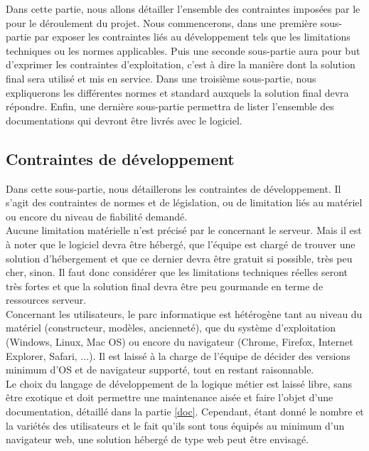 Dans cette partie, nous allons détailler l'ensemble des contraintes imposées par le \client{} pour le déroulement du projet. Nous commencerons, dans une première sous-partie par exposer les contraintes liés au développement tels que les limitations techniques ou les normes applicables. Puis une seconde sous-partie aura pour but d'exprimer les contraintes d'exploitation, c'est à dire la manière dont la solution final sera utilisé et mis en service. Dans une troisième sous-partie, nous expliquerons les différentes normes et standard auxquels la solution final devra répondre. Enfin, une dernière sous-partie permettra de lister l'ensemble des documentations qui devront être livrés avec le logiciel.


\subsection{Contraintes de développement}
Dans cette sous-partie, nous détaillerons les contraintes de développement. Il s'agit des contraintes de normes et de législation, ou de limitation liés au matériel ou encore du niveau de fiabilité demandé.\\


Aucune limitation matérielle n'est précisé par le \client{} concernant le serveur. Mais il est à noter que le logiciel devra être hébergé, que l'équipe \PICCourt{} est chargé de trouver une solution d'hébergement et que ce dernier devra être gratuit si possible, très peu cher, sinon. Il faut donc considérer que les limitations techniques réelles seront très fortes et que la solution final devra être peu gourmande en terme de ressources serveur.\\

Concernant les utilisateurs, le parc informatique est hétérogène tant au niveau du matériel (constructeur, modèles, ancienneté), que du système d'exploitation (Windows, Linux, Mac OS) ou encore du navigateur (Chrome, Firefox, Internet Explorer, Safari, ...). Il est laissé à la charge de l'équipe \PICCourt{} de décider des versions minimum d'OS et de navigateur supporté, tout en restant raisonnable.\\

Le choix du langage de développement de la logique métier est laissé libre, sans être exotique et doit permettre une maintenance aisée et faire l'objet d'une documentation, détaillé dans la partie \ref{doc}. Cependant, étant donné le nombre et la variétés des utilisateurs et le fait qu'ils sont tous équipés au minimum d'un navigateur web, une solution hébergé de type web peut être envisagé.\\

